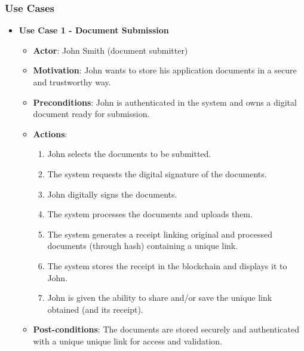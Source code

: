 \documentclass[a4paper,11pt]{article}
\begin{document}
    \subsubsection{Use Cases}
        \begin{itemize}
            \item \textbf{Use Case 1 - Document Submission}
            \begin{itemize}
                \item \textbf{Actor}: John Smith (document submitter)
                \item \textbf{Motivation}: John wants to store his application documents in a secure and trustworthy way.
                \item \textbf{Preconditions}: John is authenticated in the system and owns a digital document ready for submission.
                \item \textbf{Actions}:
                \begin{enumerate}
                    \item John selects the documents to be submitted.
                    \item The system requests the digital signature of the documents.
                    \item John digitally signs the documents.
                    \item The system processes the documents and uploads them.
                    \item The system generates a receipt linking original and processed documents (through hash) containing a unique link.
                    \item The system stores the receipt in the blockchain and displays it to John.
                    \item John is given the ability to share and/or save the unique link obtained (and its receipt).
                \end{enumerate}
                \item \textbf{Post-conditions}: The documents are stored securely and authenticated with a unique unique link for access and validation.
            \end{itemize}
            

\end{itemize}
\end{document}
